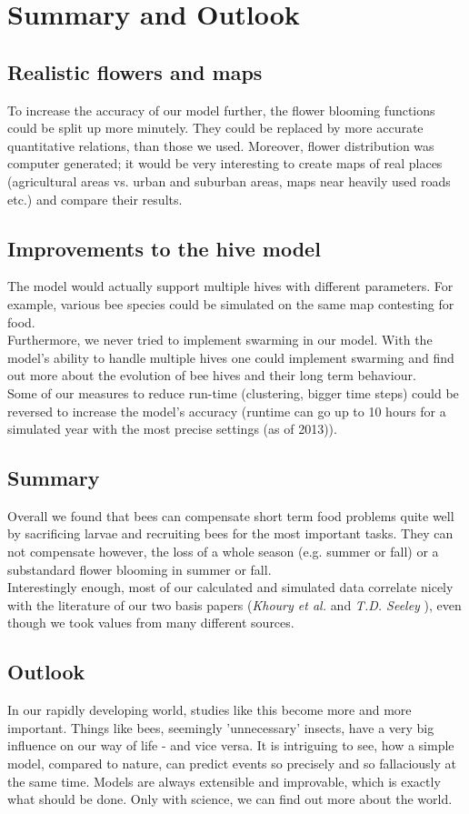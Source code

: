 \section{Summary and Outlook}
\subsection{Realistic flowers and maps}
	To increase the accuracy of our model further, the flower blooming functions could be split up more minutely. They could be replaced by more accurate quantitative relations, than those we used. Moreover, flower distribution was computer generated; it would be very interesting to create maps of real places (agricultural areas vs. urban and suburban areas, maps near heavily used roads etc.) and compare their results.
\subsection{Improvements to the hive model}
	The model would actually support multiple hives with different parameters. For example, various bee species could be simulated on the same map contesting for food. \\Furthermore, we never tried to implement swarming in our model. With the model's ability to handle multiple hives one could implement swarming and find out more about the evolution of bee hives and their long term behaviour. \\Some of our measures to reduce run-time (clustering, bigger time steps) could be reversed to increase the model's accuracy (runtime can go up to 10 hours for a simulated year with the most precise settings (as of 2013)).
\subsection{Summary}
	Overall we found that bees can compensate short term food problems quite well by sacrificing larvae and recruiting bees for the most important tasks. They can not compensate however, the loss of a whole season (e.g. summer or fall) or a substandard flower blooming in summer or fall.\\ Interestingly enough, most of our calculated and simulated data correlate nicely with the literature of our two basis papers (\textit{Khoury et al.} \cite{khoury11} and \textit{T.D. Seeley} \cite{seeley95}), even though we took values from many different sources.
\subsection{Outlook}
	In our rapidly developing world, studies like this become more and more important. Things like bees, seemingly 'unnecessary' insects, have a very big influence on our way of life - and vice versa. It is intriguing to see, how a simple model, compared to nature, can predict events so precisely and so fallaciously at the same time. Models are always extensible and improvable, which is exactly what should be done. Only with science, we can find out more about the world.  